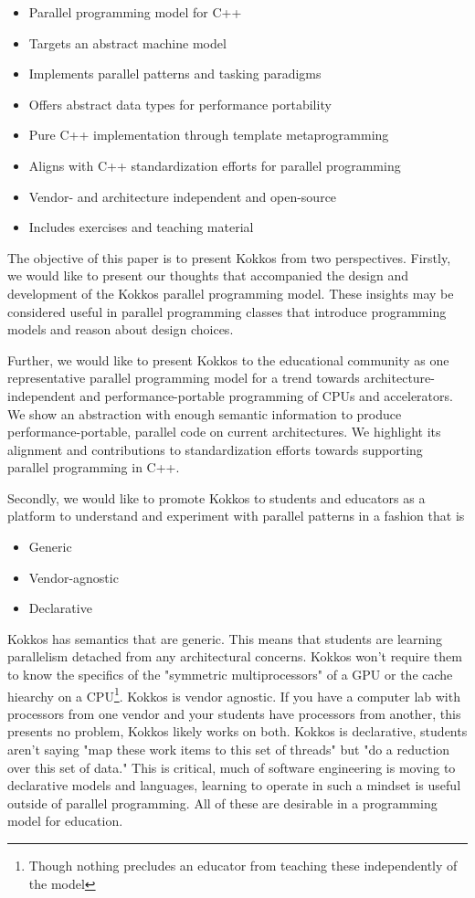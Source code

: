 \begin{itemize}
\item Parallel programming model for C++
\item Targets an abstract machine model
\item Implements parallel patterns and tasking paradigms
\item Offers abstract data types for performance portability
\item Pure C++ implementation through template metaprogramming
\item Aligns with C++ standardization efforts for parallel programming
\item Vendor- and architecture independent and open-source
\item Includes exercises and teaching material
\end{itemize}

The objective of this paper is to present Kokkos from two perspectives. Firstly, we would like to present our thoughts that accompanied the design and development of the Kokkos parallel programming model. These insights may be considered useful in parallel programming classes that introduce programming models and reason about design choices.

Further, we would like to present Kokkos to the educational community as one representative parallel programming model for a trend towards architecture-independent and performance-portable programming of CPUs and accelerators. We show an abstraction with enough semantic information to produce performance-portable, parallel code on current architectures. We highlight its alignment and contributions to standardization efforts towards supporting parallel programming in C++. 

Secondly, we would like to promote Kokkos to students and educators as a platform to understand and experiment with parallel patterns in a fashion that is

\begin{itemize}
\item Generic
\item Vendor-agnostic
\item Declarative
\end{itemize}

Kokkos has semantics that are generic. This means that students are learning parallelism detached from any architectural concerns. Kokkos won't require them to know the specifics of the "symmetric multiprocessors" of a GPU or the cache hiearchy on a CPU\footnote{Though nothing precludes an educator from teaching these independently of the model}. Kokkos is vendor agnostic. If you have a computer lab with processors from one vendor and your students have processors from another, this presents no problem, Kokkos likely works on both. Kokkos is declarative, students aren't saying "map these work items to this set of threads" but "do a reduction over this set of data." This is critical, much of software engineering is moving to declarative models and languages, learning to operate in such a mindset is useful outside of parallel programming. All of these are desirable in a programming model for education.

